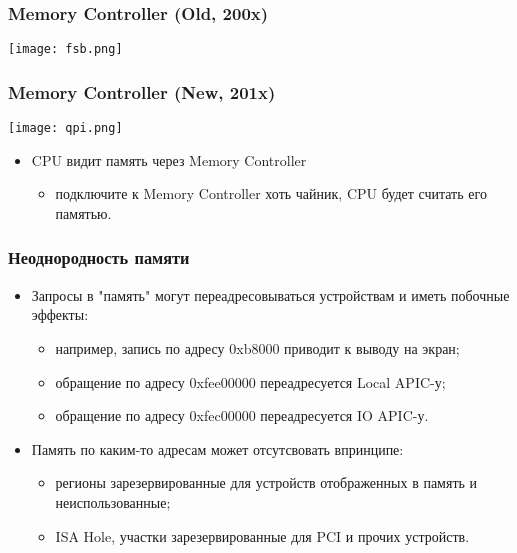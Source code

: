 \begin{frame}
\frametitle{Memory Controller (Old, 200x)}
\begin{center}
  \texttt{[image: fsb.png]}
\end{center}
\end{frame}

\begin{frame}
\frametitle{Memory Controller (New, 201x)}
\begin{center}
  \texttt{[image: qpi.png]}
\end{center}
\begin{itemize}
  \item CPU видит память через Memory Controller
  \begin{itemize}
    \item подключите к Memory Controller хоть чайник, CPU будет считать его
    памятью.
  \end{itemize}
\end{itemize}
\end{frame}

\begin{frame}
\frametitle{Неоднородность памяти}
\begin{itemize}
  \item Запросы в "память" могут переадресовываться устройствам и иметь побочные
  эффекты:
  \begin{itemize}
    \item например, запись по адресу 0xb8000 приводит к выводу на экран;
    \item обращение по адресу 0xfee00000 переадресуется Local APIC-у;
    \item обращение по адресу 0xfec00000 переадресуется IO APIC-у.
  \end{itemize}
  \item Память по каким-то адресам может отсутсвовать впринципе:
  \begin{itemize}
    \item регионы зарезервированные для устройств отображенных в память и
    неиспользованные;
    \item ISA Hole, участки зарезервированные для PCI и прочих устройств.
  \end{itemize}
\end{itemize}
\end{frame}

